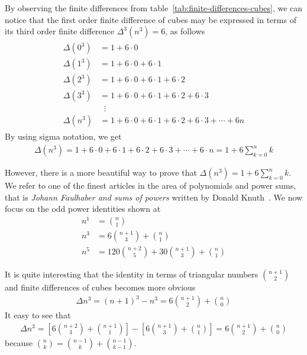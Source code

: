 By observing the finite differences from table~\eqref{tab:finite-differences-cubes}, we can notice that
the first order finite difference of cubes may be expressed in terms of its
third order finite difference $\Delta^3(n^3) = 6$, as follows
\begin{align*}
    \begin{split}
        \Delta(0^3) &= 1+6 \cdot 0 \\
        \Delta(1^3) &= 1+6\cdot0+6\cdot1 \\
        \Delta(2^3) &= 1+6\cdot0+6\cdot1+6\cdot2 \\
        \Delta(3^3) &= 1+6\cdot0+6\cdot1+6\cdot2+6\cdot3 \\
        &\; \; \vdots \\
        \Delta(n^3) &= 1+6\cdot0+6\cdot1+6\cdot2+6\cdot3 + \cdots + 6n
    \end{split}
\end{align*}
By using sigma notation, we get
\begin{align*}
    \Delta(n^3) = 1+6\cdot0+6\cdot1+6\cdot2+6\cdot3+\cdots+6\cdot n = 1 + 6 \sum_{k=0}^{n} k
\end{align*}

However, there is a more beautiful way to prove that $\Delta(n^3) = 1 + 6 \sum_{k=0}^{n} k$.
We refer to one of the finest articles in the area of polynomials and power sums,
that is \textit{Johann Faulhaber and sums of powers} written by Donald Knuth~\cite{knuth1993johann}.
We now focus on the odd power identities shown at~\cite[~p. 9]{knuth1993johann}
\begin{align*}
    n^1 &= \binom{n}{1} \\
    n^3 &= 6 \binom{n+1}{3} + \binom{n}{1} \\
    n^5 &= 120 \binom{n+2}{5} + 30 \binom{n+1}{3} + \binom{n}{1}
\end{align*}

It is quite interesting that the identity in terms of triangular numbers $\binom{n+1}{2}$
and finite differences of cubes becomes more obvious
\begin{align*}
    \Delta n^3
    = (n+1)^3 - n^3
    =  6 \binom{n+1}{2} + \binom{n}{0}
\end{align*}
It easy to see that
\begin{align*}
    \Delta n^3
    = \left[ 6 \binom{n+2}{3} + \binom{n+1}{1} \right] - \left[ 6 \binom{n+1}{3} + \binom{n}{1} \right]
    = 6 \binom{n+1}{2} + \binom{n}{0}
\end{align*}
because $\binom{n}{k} = \binom{n-1}{k} + \binom{n-1}{k-1}$.

